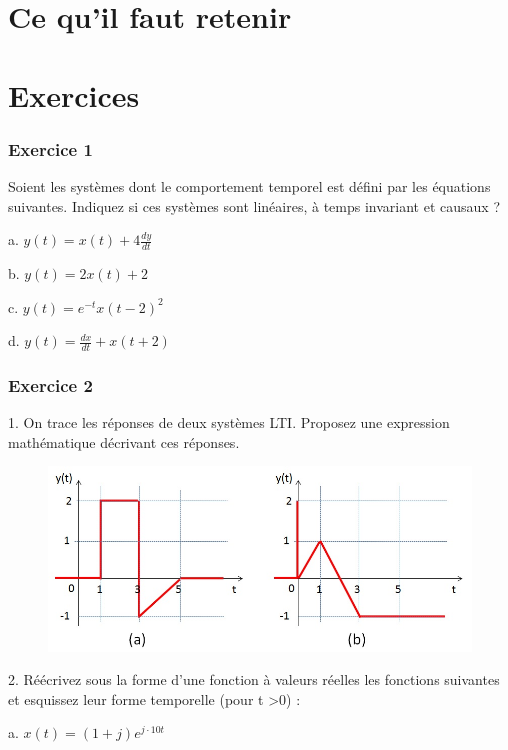 \documentclass[]{book}
\begin{document}
{		
	
	\section{Ce qu'il faut retenir}
	
	
	\section{Exercices}
	
	\subsubsection{Exercice 1} 
	Soient les systèmes dont le comportement temporel est défini par les équations suivantes. Indiquez si ces systèmes sont linéaires, à temps invariant et causaux ?
	
	a. $y(t) = x(t)+4\frac{dy}{dt}$ 
	
	b. $y(t) = 2x(t)+2$ 
	
	c. $y(t)=e^{-t}x(t-2)^{2}$
	
	d. $y(t)=\frac{dx}{dt}+x(t+2)$
	
	\vspace{1\baselineskip}
	
	\subsubsection{Exercice 2} 
	1. On trace les réponses de deux systèmes LTI. Proposez une expression mathématique décrivant ces réponses.
	\begin{figure}[h!]
		\centering
		\includegraphics[scale=0.5]{images/Exo_2_2.jpg} 
	\end{figure} 

	
	2. Réécrivez sous la forme d'une fonction à valeurs réelles les fonctions suivantes et esquissez leur forme temporelle (pour t >0) :
	
	a. $x(t) = (1+j)e^{j\cdot 10t}$ 
	
}
\end{document}

